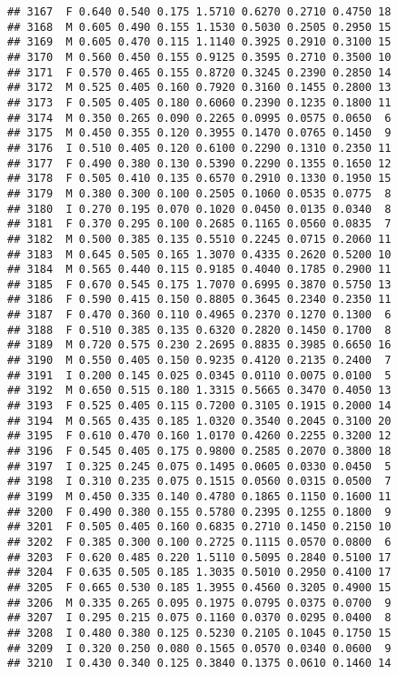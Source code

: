 \documentclass[
]{article}
\begin{document}
\begin{verbatim}
## 3167  F 0.640 0.540 0.175 1.5710 0.6270 0.2710 0.4750 18
## 3168  M 0.605 0.490 0.155 1.1530 0.5030 0.2505 0.2950 15
## 3169  M 0.605 0.470 0.115 1.1140 0.3925 0.2910 0.3100 15
## 3170  M 0.560 0.450 0.155 0.9125 0.3595 0.2710 0.3500 10
## 3171  F 0.570 0.465 0.155 0.8720 0.3245 0.2390 0.2850 14
## 3172  M 0.525 0.405 0.160 0.7920 0.3160 0.1455 0.2800 13
## 3173  F 0.505 0.405 0.180 0.6060 0.2390 0.1235 0.1800 11
## 3174  M 0.350 0.265 0.090 0.2265 0.0995 0.0575 0.0650  6
## 3175  M 0.450 0.355 0.120 0.3955 0.1470 0.0765 0.1450  9
## 3176  I 0.510 0.405 0.120 0.6100 0.2290 0.1310 0.2350 11
## 3177  F 0.490 0.380 0.130 0.5390 0.2290 0.1355 0.1650 12
## 3178  F 0.505 0.410 0.135 0.6570 0.2910 0.1330 0.1950 15
## 3179  M 0.380 0.300 0.100 0.2505 0.1060 0.0535 0.0775  8
## 3180  I 0.270 0.195 0.070 0.1020 0.0450 0.0135 0.0340  8
## 3181  F 0.370 0.295 0.100 0.2685 0.1165 0.0560 0.0835  7
## 3182  M 0.500 0.385 0.135 0.5510 0.2245 0.0715 0.2060 11
## 3183  M 0.645 0.505 0.165 1.3070 0.4335 0.2620 0.5200 10
## 3184  M 0.565 0.440 0.115 0.9185 0.4040 0.1785 0.2900 11
## 3185  F 0.670 0.545 0.175 1.7070 0.6995 0.3870 0.5750 13
## 3186  F 0.590 0.415 0.150 0.8805 0.3645 0.2340 0.2350 11
## 3187  F 0.470 0.360 0.110 0.4965 0.2370 0.1270 0.1300  6
## 3188  F 0.510 0.385 0.135 0.6320 0.2820 0.1450 0.1700  8
## 3189  M 0.720 0.575 0.230 2.2695 0.8835 0.3985 0.6650 16
## 3190  M 0.550 0.405 0.150 0.9235 0.4120 0.2135 0.2400  7
## 3191  I 0.200 0.145 0.025 0.0345 0.0110 0.0075 0.0100  5
## 3192  M 0.650 0.515 0.180 1.3315 0.5665 0.3470 0.4050 13
## 3193  F 0.525 0.405 0.115 0.7200 0.3105 0.1915 0.2000 14
## 3194  M 0.565 0.435 0.185 1.0320 0.3540 0.2045 0.3100 20
## 3195  F 0.610 0.470 0.160 1.0170 0.4260 0.2255 0.3200 12
## 3196  F 0.545 0.405 0.175 0.9800 0.2585 0.2070 0.3800 18
## 3197  I 0.325 0.245 0.075 0.1495 0.0605 0.0330 0.0450  5
## 3198  I 0.310 0.235 0.075 0.1515 0.0560 0.0315 0.0500  7
## 3199  M 0.450 0.335 0.140 0.4780 0.1865 0.1150 0.1600 11
## 3200  F 0.490 0.380 0.155 0.5780 0.2395 0.1255 0.1800  9
## 3201  F 0.505 0.405 0.160 0.6835 0.2710 0.1450 0.2150 10
## 3202  F 0.385 0.300 0.100 0.2725 0.1115 0.0570 0.0800  6
## 3203  F 0.620 0.485 0.220 1.5110 0.5095 0.2840 0.5100 17
## 3204  F 0.635 0.505 0.185 1.3035 0.5010 0.2950 0.4100 17
## 3205  F 0.665 0.530 0.185 1.3955 0.4560 0.3205 0.4900 15
## 3206  M 0.335 0.265 0.095 0.1975 0.0795 0.0375 0.0700  9
## 3207  I 0.295 0.215 0.075 0.1160 0.0370 0.0295 0.0400  8
## 3208  I 0.480 0.380 0.125 0.5230 0.2105 0.1045 0.1750 15
## 3209  I 0.320 0.250 0.080 0.1565 0.0570 0.0340 0.0600  9
## 3210  I 0.430 0.340 0.125 0.3840 0.1375 0.0610 0.1460 14

\end{verbatim}
\end{document}
